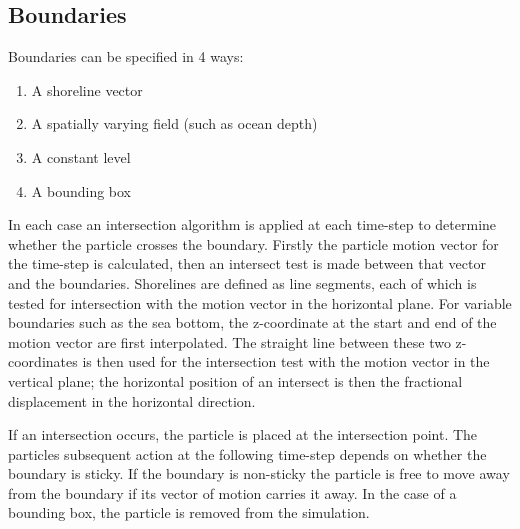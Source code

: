 \documentclass[a4paper]{article}
\begin{document}
\subsection{Boundaries}
Boundaries can be specified in 4 ways:
\begin{enumerate}
\item A shoreline vector
\item A spatially varying field (such as ocean depth) 
\item A constant level
\item A bounding box
\end{enumerate}
In each case an intersection algorithm is applied at each time-step to determine whether the particle crosses the boundary.
Firstly the particle motion vector for the time-step is calculated, then an intersect test is made between that vector and the boundaries.
Shorelines are defined as line segments, each of which is tested for intersection with the motion vector in the horizontal plane.
For variable boundaries such as the sea bottom, the z-coordinate at the start and end of the motion vector are first interpolated.
The straight line between these two z-coordinates is then used for the intersection test with the motion vector in the vertical plane;
the horizontal position of an intersect is then the fractional displacement in the horizontal direction.

If an intersection occurs, the particle is placed at the intersection point. 
The particles subsequent action at the following time-step depends on whether the boundary is sticky.
If the boundary is non-sticky the particle is free to move away from the boundary if its vector of motion carries it away.
In the case of a bounding box, the particle is removed from the simulation.
\end{document}
